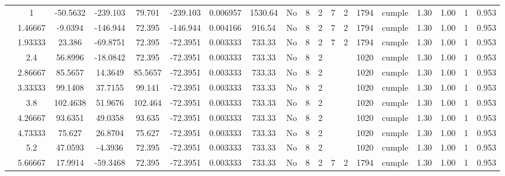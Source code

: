 \begin{table}[H]
{\begin{tabular}{|c|c|c|c|c|c|r|c|c|c|c|c|c|c|c|c|c|c|c|}
\cline{2-19}    & \cellcolor[rgb]{ .851,  .882,  .949}1 & -50.5632 & -239.103 & 79.701 & -239.103 & 0.006957 & 1530.64 & No  & 8   & 2   & 7   & 2   & 1794 & \cellcolor[rgb]{ .776,  .937,  .808}cumple & 1.30 & 1.00 & 1   & 0.953 \bigstrut\\
\cline{2-19}    & 1.46667 & -9.0394 & -146.944 & 72.395 & -146.944 & 0.004166 & 916.54 & No  & 8   & 2   & 7   & 2   & 1794 & \cellcolor[rgb]{ .776,  .937,  .808}cumple & 1.30 & 1.00 & 1   & 0.953 \bigstrut\\
\cline{2-19}    & 1.93333 & 23.386 & -69.8751 & 72.395 & -72.3951 & 0.003333 & 733.33 & No  & 8   & 2   & 7   & 2   & 1794 & \cellcolor[rgb]{ .776,  .937,  .808}cumple & 1.30 & 1.00 & 1   & 0.953 \bigstrut\\
\cline{2-19}    & 2.4 & 56.8996 & -18.0842 & 72.395 & -72.3951 & 0.003333 & 733.33 & No  & 8   & 2   &     &     & 1020 & \cellcolor[rgb]{ .776,  .937,  .808}cumple & 1.30 & 1.00 & 1   & 0.953 \bigstrut\\
\cline{2-19}    & 2.86667 & 85.5657 & 14.3649 & 85.5657 & -72.3951 & 0.003333 & 733.33 & No  & 8   & 2   &     &     & 1020 & \cellcolor[rgb]{ .776,  .937,  .808}cumple & 1.30 & 1.00 & 1   & 0.953 \bigstrut\\
\cline{2-19}    & 3.33333 & 99.1408 & 37.7155 & 99.141 & -72.3951 & 0.003333 & 733.33 & No  & 8   & 2   &     &     & 1020 & \cellcolor[rgb]{ .776,  .937,  .808}cumple & 1.30 & 1.00 & 1   & 0.953 \bigstrut\\
\cline{2-19}    & 3.8 & 102.4638 & 51.9676 & 102.464 & -72.3951 & 0.003333 & 733.33 & No  & 8   & 2   &     &     & 1020 & \cellcolor[rgb]{ .776,  .937,  .808}cumple & 1.30 & 1.00 & 1   & 0.953 \bigstrut\\
\cline{2-19}    & 4.26667 & 93.6351 & 49.0358 & 93.635 & -72.3951 & 0.003333 & 733.33 & No  & 8   & 2   &     &     & 1020 & \cellcolor[rgb]{ .776,  .937,  .808}cumple & 1.30 & 1.00 & 1   & 0.953 \bigstrut\\
\cline{2-19}    & 4.73333 & 75.627 & 26.8704 & 75.627 & -72.3951 & 0.003333 & 733.33 & No  & 8   & 2   &     &     & 1020 & \cellcolor[rgb]{ .776,  .937,  .808}cumple & 1.30 & 1.00 & 1   & 0.953 \bigstrut\\
\cline{2-19}    & 5.2 & 47.0593 & -4.3936 & 72.395 & -72.3951 & 0.003333 & 733.33 & No  & 8   & 2   &     &     & 1020 & \cellcolor[rgb]{ .776,  .937,  .808}cumple & 1.30 & 1.00 & 1   & 0.953 \bigstrut\\
\cline{2-19}    & 5.66667 & 17.9914 & -59.3468 & 72.395 & -72.3951 & 0.003333 & 733.33 & No  & 8   & 2   & 7   & 2   & 1794 & \cellcolor[rgb]{ .776,  .937,  .808}cumple & 1.30 & 1.00 & 1   & 0.953 \bigstrut\\

\end{tabular}}
\end{table}
